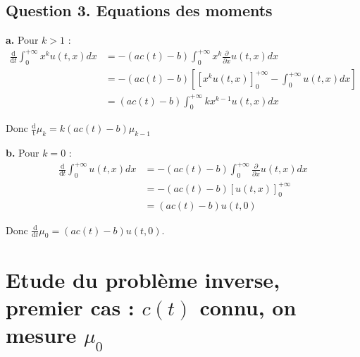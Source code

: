 \documentclass[a4paper]{article}
\begin{document}
\subsection*{Question 3. Equations des moments}

\textbf{a.}
Pour $k>1$ :
\[	
\begin{split}
	\displaystyle \frac{\mathrm{d}}{\mathrm{d} t} \int_0^{+\infty} x^k u(t,x)dx
	                        &= - (ac(t)-b)\int_0^{+\infty}
							x^k \frac{\partial}{\partial x}u(t,x)dx\\
							&= - (ac(t)-b) [
							[x^k u(t,x)]_0^{+\infty} 
							- \int_0^{+\infty} u(t,x)dx ]\\
							& = (ac(t)-b) \int_0^{+\infty} kx^{k-1} u(t,x)dx
\end{split}
\]

Donc $ \displaystyle \frac{\mathrm{d}}{\mathrm t}\mu_k = k (ac(t)-b) \mu_{k-1}$


\textbf{b.}
Pour $k =0$ :
\[
\begin{split}
	\displaystyle \frac{\mathrm{d}}{\mathrm{d} t} \int_0^{+\infty} u(t,x)dx
	                        &= - (ac(t)-b)\int_0^{+\infty}\frac{\partial}{\partial x}u(t,x)dx\\
							&= - (ac(t)-b) 
							[u(t,x)]_0^{+\infty} \\
							&= 	(ac(t)-b)u(t,0)
\end{split}
\]

Donc $\displaystyle \frac{\mathrm{d}}{\mathrm{d} t} \mu_0 = (ac(t)-b)u(t,0)$.





\section{Etude du problème inverse, premier cas : $c(t)$ connu, on mesure $\mu_0$}
\end{document}
